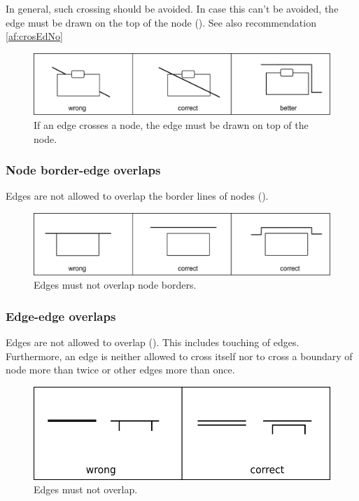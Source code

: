 In general, such crossing should be avoided.  In case this can't be avoided, the edge must be drawn on the top of the node (). See also recommendation \ref{af:crosEdNo} 

\begin{figure}[h!]
  \centering
  \includegraphics[scale=0.4]{images/build/layout-node-edge.pdf}
  \caption{If an edge crosses a node, the edge must be drawn on top  of the node.}\label{fig:af:layout2}
\end{figure}

\subsubsection{Node border-edge overlaps}

Edges are not allowed to overlap the border lines of nodes ().

\begin{figure}[h!]
  \centering
  \includegraphics[scale=0.4]{images/build/layout-node-border-edge.pdf}
  \caption{Edges must not overlap node borders.}\label{fig:af:layout3}
\end{figure}

\subsubsection{Edge-edge overlaps}

Edges are not allowed to overlap (). This includes touching of edges. Furthermore, an edge is neither allowed to cross itself nor to cross
a boundary of node more than twice or other edges more than once.

\begin{figure}[h!]
  \centering
  \includegraphics[scale=0.4]{images/layout-edge-edge}
  \caption{Edges must not overlap.}\label{fig:af:layout4}
\end{figure}

